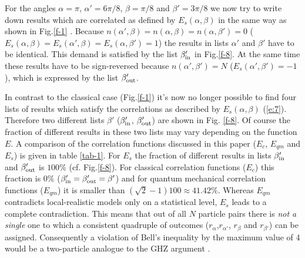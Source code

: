 For the angles $\alpha = \pi $,
$\alpha '= 6 \pi / 8$,
$\beta = \pi / 8$ and
$\beta '= 3   \pi / 8$
we now try to write down results which are correlated as defined by
$E_s(\alpha,\beta)$
in the same way as shown in Fig.\ref{f-1} .
Because
$n(\alpha ',\beta )=
n(\alpha ,\beta )=
n(\alpha ,\beta ')=0$ ($E_s(\alpha , \beta ) = E_s(\alpha ', \beta ) =
E_s(\alpha ,\beta ') = 1$)
the results in lists $\alpha '$ and $\beta '$ have to
be identical.
This demand is satisfied by the list $\beta_{\rm in} '$ in Fig.\ref{f-8}.
At the same time these results have to be sign-reversed
because
$n(\alpha ',\beta ')=N$ ($E_s(\alpha ',\beta ')=-1$),
which is expressed by the list $\beta_{\rm out} '$.

In contrast to the classical case (Fig.\ref{f-1}) it\rq s now no longer
possible to find four lists of results which satisfy the correlations as
described by $E_s(\alpha , \beta )$ (\ref{e:7}). Therefore two different
lists $\beta '$ ($\beta_{\rm in} '$, $\beta_{\rm out} '$) are shown in
Fig. \ref{f-8}. Of course the fraction of different results in these two
lists may vary depending on the function $E$.
A comparison of the correlation functions discussed in this paper
($E_c$, $E_{qm}$ and $E_s$) is given in table \ref{tab-1}.
For $E_s$ the fraction of different results in lists
$\beta_{\rm in} '$
and $\beta_{\rm out} '$ is $100 \%$ (cf. Fig.\ref{f-8}).
For classical correlation functions ($E_c$) this fraction is
$0 \%$ ($\beta_{\rm in} ' = \beta_{\rm out} ' = \beta '$)
and for quantum mechanical correlation functions ($E_{qm}$) it
is smaller than $(\sqrt{2}-1) 100 \approx 41.42 \%$.
Whereas $E_{qm}$ contradicts local-realistic models only
on a statistical level,
$E_s$ leads to a complete contradiction.
This means that out of all $N$ particle pairs there is {\em not a single}
one to which a consistent quadruple of outcomes ($r_\alpha$,$r_{\alpha '}$,
$r_\beta$ and $r_{\beta '}$)
can be assigned. Consequently a violation of Bell\rq s inequality by
the maximum value of 4 would be a
two-particle analogue to the GHZ argument \cite{ghz}.

